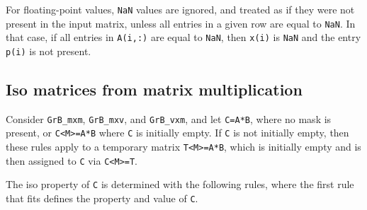 \documentclass[12pt]{article}
\begin{document}
For floating-point values, \verb'NaN' values are ignored, and treated as if
they were not present in the input matrix, unless all entries in a given row
are equal to \verb'NaN'.  In that case, if all entries in \verb'A(i,:)' are
equal to \verb'NaN', then \verb'x(i)' is \verb'NaN' and the entry \verb'p(i)'
is not present.

\subsection{Iso matrices from matrix multiplication}
\label{iso_mxm}

Consider \verb'GrB_mxm', \verb'GrB_mxv', and \verb'GrB_vxm', and
    let \verb'C=A*B', where no mask is present, or \verb'C<M>=A*B' where
    \verb'C' is initially empty.  If \verb'C' is not initially empty,
    then these rules apply to a temporary matrix \verb'T<M>=A*B', which is
    initially empty and is then assigned to \verb'C' via \verb'C<M>=T'.

    The iso property of \verb'C' is determined with the following rules,
    where the first rule that fits defines the property and value of \verb'C'.
\end{document}

